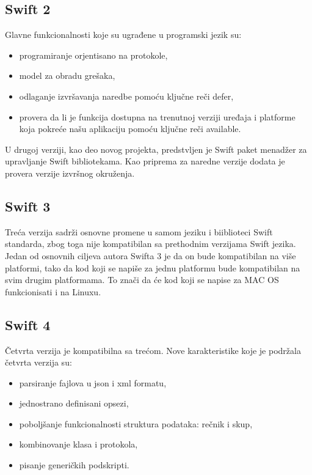 \documentclass[a4paper]{article}
\begin{document}
\subsection{Swift 2}
\label{subsec:podnaslov2}
Glavne funkcionalnosti koje su ugrađene u programski jezik su:
\begin{itemize}
\item programiranje orjentisano na protokole,
\item model za obradu grešaka,
\item odlaganje izvršavanja naredbe pomoću ključne reči defer,
\item provera da li je funkcija dostupna na trenutnoj verziji uređaja i platforme koja pokreće našu aplikaciju pomoću ključne reči available.
\end{itemize}

U drugoj verziji, kao deo novog projekta, predstvljen je Swift paket menadžer za upravljanje Swift bibliotekama. Kao priprema za naredne verzije dodata je provera verzije izvršnog okruženja.

\subsection{Swift 3}
\label{subsec:podnaslov3}
Treća verzija sadrži osnovne promene u samom jeziku i biiblioteci Swift standarda, zbog toga nije kompatibilan sa prethodnim verzijama Swift jezika. Jedan od osnovnih ciljeva autora Swifta 3 je da on bude kompatibilan na više platformi, tako da kod koji se napiše za jednu platformu bude kompatibilan na svim drugim platformama. To znači da će kod koji se napise za MAC OS funkcionisati i na Linuxu. 


\subsection{Swift 4}
\label{subsec:podnaslov4}
Četvrta verzija je kompatibilna sa trećom. Nove karakteristike koje je podržala četvrta verzija su:
\begin{itemize}
\item parsiranje fajlova u json i xml formatu,
\item jednostrano definisani opsezi,
\item poboljšanje funkcionalnosti struktura podataka: rečnik i skup,
\item kombinovanje klasa i protokola,
\item pisanje generičkih podskripti.
\end{itemize}
\end{document}
